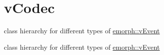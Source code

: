 \hypertarget{group__vCodec}{\section{v\-Codec}
\label{group__vCodec}
}


class hierarchy for different types of \hyperlink{classemorph_1_1vEvent}{emorph\-::v\-Event}  


class hierarchy for different types of \hyperlink{classemorph_1_1vEvent}{emorph\-::v\-Event} 